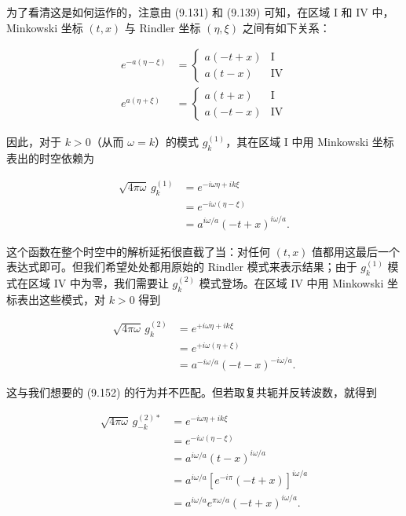 为了看清这是如何运作的，注意由 (9.131) 和 (9.139) 可知，在区域 I 和 IV 中，Minkowski 坐标 $(t,x)$ 与 Rindler 坐标 $(\eta,\xi)$ 之间有如下关系：

\begin{equation*}
\begin{aligned}
e^{-a(\eta-\xi)} &= \begin{cases} a(-t+x) & \mathrm{I} \\ a(t-x) & \mathrm{IV} \end{cases} \\[10pt]
e^{a(\eta+\xi)} &= \begin{cases} a(t+x) & \mathrm{I} \\ a(-t-x) & \mathrm{IV} \end{cases}
\end{aligned}
\tag{9.151}
\end{equation*}

因此，对于 $k>0$（从而 $\omega=k$）的模式 $g_{k}^{(1)}$，其在区域 I 中用 Minkowski 坐标表出的时空依赖为

\begin{align*}
\sqrt{4\pi\omega}\, g_{k}^{(1)} &= e^{-i\omega\eta+ik\xi} \\
&= e^{-i\omega(\eta-\xi)} \\
&= a^{i\omega/a}(-t+x)^{i\omega/a}.
\tag{9.152}
\end{align*}

这个函数在整个时空中的解析延拓很直截了当：对任何 $(t,x)$ 值都用这最后一个表达式即可。但我们希望处处都用原始的 Rindler 模式来表示结果；由于 $g_{k}^{(1)}$ 模式在区域 IV 中为零，我们需要让 $g_{k}^{(2)}$ 模式登场。在区域 IV 中用 Minkowski 坐标表出这些模式，对 $k>0$ 得到

\begin{align*}
\sqrt{4\pi\omega}\, g_{k}^{(2)} &= e^{+i\omega\eta+ik\xi} \\
&= e^{+i\omega(\eta+\xi)} \\
&= a^{-i\omega/a}(-t-x)^{-i\omega/a}.
\tag{9.153}
\end{align*}

这与我们想要的 (9.152) 的行为并不匹配。但若取复共轭并反转波数，就得到

\begin{align*}
\sqrt{4\pi\omega}\, g_{-k}^{(2)*} &= e^{-i\omega\eta+ik\xi} \\
&= e^{-i\omega(\eta-\xi)} \\
&= a^{i\omega/a}(t-x)^{i\omega/a} \\
&= a^{i\omega/a}[e^{-i\pi}(-t+x)]^{i\omega/a} \\
&= a^{i\omega/a}e^{\pi\omega/a}(-t+x)^{i\omega/a}.
\tag{9.154}
\end{align*}

